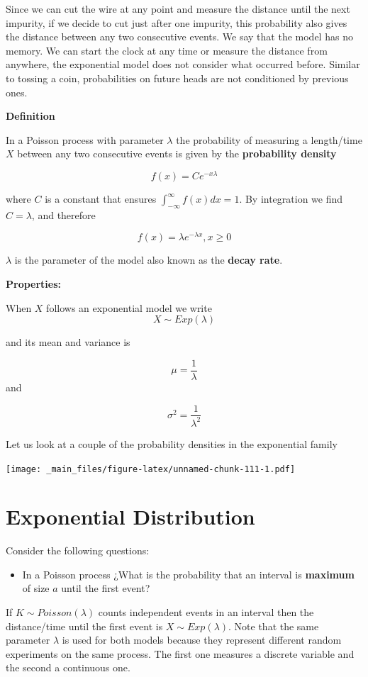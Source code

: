 \documentclass[
]{book}
\providecommand{\tightlist}{%
  \setlength{\itemsep}{0pt}\setlength{\parskip}{0pt}}
\begin{document}
Since we can cut the wire at any point and measure the distance until the next impurity, if we decide to cut just after one impurity, this probability also gives the distance between any two consecutive events. We say that the model has no memory. We can start the clock at any time or measure the distance from anywhere, the exponential model does not consider what occurred before. Similar to tossing a coin, probabilities on future heads are not conditioned by previous ones.

\textbf{Definition}

In a Poisson process with parameter \(\lambda\) the probability of measuring a length/time \(X\) between any two consecutive events is given by the \textbf{probability density}

\[f(x)= C e^{-x\lambda}\]

where \(C\) is a constant that ensures \(\int_{-\infty}^{\infty} f(x) dx =1\). By integration we find \(C=\lambda\), and therefore

\[f(x)=\lambda e^{-\lambda x}, x\geq 0\]

\(\lambda\) is the parameter of the model also known as the \textbf{decay rate}.

\textbf{Properties:}

When \(X\) follows an exponential model we write \[X \sim Exp(\lambda)\]

and its mean and variance is

\[\mu=\frac{1}{\lambda}\]
and

\[\sigma^2=\frac{1}{\lambda^2}\]

Let us look at a couple of the probability densities in the exponential family

\texttt{[image: \_main\_files/figure-latex/unnamed-chunk-111-1.pdf]}

\hypertarget{exponential-distribution}{%
\section{Exponential Distribution}\label{exponential-distribution}}

Consider the following questions:

\begin{itemize}
\tightlist
\item
  In a Poisson process ¿What is the probability that an interval is \textbf{maximum} of size \(a\) until the first event?
\end{itemize}

If \(K \sim Poisson(\lambda)\) counts independent events in an interval then the distance/time until the first event is \(X \sim Exp(\lambda)\). Note that the same parameter \(\lambda\) is used for both models because they represent different random experiments on the same process. The first one measures a discrete variable and the second a continuous one.
\end{document}
